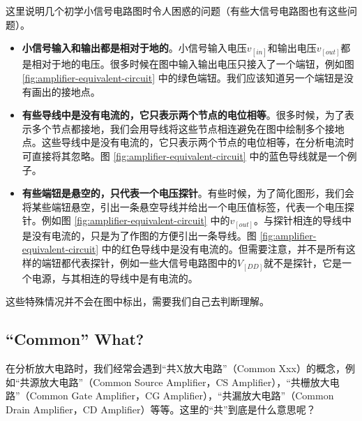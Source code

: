 这里说明几个初学小信号电路图时令人困惑的问题（有些大信号电路图也有这些问题）。
\begin{itemize}
    \item \textbf{小信号输入和输出都是相对于地的}。小信号输入电压$v_[in]$和输出电压$v_[out]$都是相对于地的电压。很多时候在图中输入输出电压只接入了一个端钮，例如图 \ref{fig:amplifier-equivalent-circuit} 中的绿色端钮。我们应该知道另一个端钮是没有画出的接地点。

    \item \textbf{有些导线中是没有电流的，它只表示两个节点的电位相等}。很多时候，为了表示多个节点都接地，我们会用导线将这些节点相连避免在图中绘制多个接地点。这些导线中是没有电流的，它只表示两个节点的电位相等，在分析电流时可直接将其忽略。图 \ref{fig:amplifier-equivalent-circuit} 中的蓝色导线就是一个例子。

    \item \textbf{有些端钮是悬空的，只代表一个电压探针}。有些时候，为了简化图形，我们会将某些端钮悬空，引出一条悬空导线并给出一个电压值标签，代表一个电压探针。例如图 \ref{fig:amplifier-equivalent-circuit} 中的$v_[out]$。与探针相连的导线中是没有电流的，只是为了作图的方便引出一条导线。图 \ref{fig:amplifier-equivalent-circuit} 中的红色导线中是没有电流的。但需要注意，并不是所有这样的端钮都代表探针，例如一些大信号电路图中的$V_[DD]$就不是探针，它是一个电源，与其相连的导线中是有电流的。
\end{itemize}
这些特殊情况并不会在图中标出，需要我们自己去判断理解。

\subsection{``Common'' What?}
在分析放大电路时，我们经常会遇到“共X放大电路”（Common Xxx）的概念，例如“共源放大电路”（Common Source Amplifier，CS Amplifier），“共栅放大电路”（Common Gate Amplifier，CG Amplifier），“共漏放大电路”（Common Drain Amplifier，CD Amplifier）等等。这里的“共”到底是什么意思呢？
